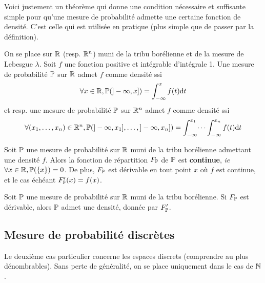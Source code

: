 \documentclass[../integ-proba.tex]{subfiles}
\begin{document}
    Voici justement un théorème qui donne une condition nécessaire et suffisante simple pour qu'une mesure de probabilité admette une certaine fonction de densité.
    C'est celle qui est utilisée en pratique (plus simple que de passer par la définition).

    \begin{thm}
        \label{thm:cns_densite}
        On se place sur $\mathbb{R}$ (resp. $\mathbb{R}^n$) muni de la tribu borélienne et de la mesure de Lebesgue $\lambda$.
        Soit $f$ une fonction positive et intégrable d'intégrale 1.
        Une mesure de probabilité $\mathbb{P}$ sur $\mathbb{R}$ admet $f$ comme densité ssi
        \begin{displaymath}
            \forall x \in \mathbb{R}, \mathbb{P}(]-\infty, x]) = \int_{- \infty}^x f(t)\textnormal{d}t
        \end{displaymath}
        et resp. une mesure de probabilité $\mathbb{P}$ sur $\mathbb{R}^n$ admet $f$ comme densité ssi
        \begin{displaymath}
            \forall (x_1,\ldots,x_n) \in \mathbb{R}^n, \mathbb{P}(]-\infty, x_1], \ldots, ]-\infty, x_n]) = \int_{- \infty}^{x_1} \dots \int_{- \infty}^{x_n} f(t) \textnormal{d}t
        \end{displaymath}
    \end{thm}

    \begin{prop}
        \label{prop:continuite_fdrep_densite}
        Soit $\mathbb{P}$ une mesure de probabilité sur $\mathbb{R}$ muni de la tribu borélienne admettant une densité $f$.
        Alors la fonction de répartition $F_{\mathbb{P}}$ de $\mathbb{P}$ est \textbf{continue}, \textit{ie} $\forall x \in \mathbb{R}, \mathbb{P}(\left\{ x \right\}) = 0$.
        De plus, $F_{\mathbb{P}}$ est dérivable en tout point $x$ où $f$ est continue, et le cas échéant $F'_{\mathbb{P}}(x) = f(x)$.
    \end{prop}

    \begin{prop}
        Soit $\mathbb{P}$ une mesure de probabilité sur $\mathbb{R}$ muni de la tribu borélienne.
        Si $F_{\mathbb{P}}$ est dérivable, alors $\mathbb{P}$ admet une densité, donnée par $F'_{\mathbb{P}}$.
    \end{prop}



    \subsection{Mesure de probabilité discrètes}
    Le deuxième cas particulier concerne les espaces discrets (comprendre au plus dénombrables).
    Sans perte de généralité, on se place uniquement dans le cas de $\mathbb{N}$.
\end{document}
